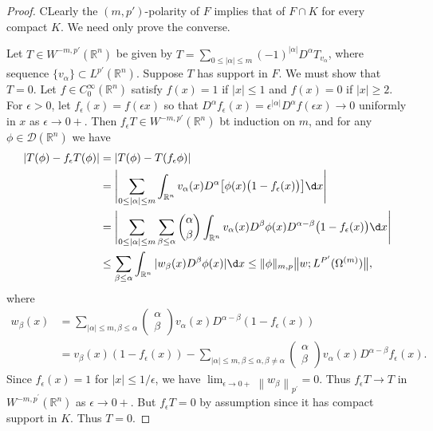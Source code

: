 \begin{proof}
  CLearly the $(m,p')$-polarity of $F$ implies that of $F\cap K$
  for every compact $K$. We need only prove the converse.

  Let $T\in W^{-m,p'}(\mathbb{R}^n)$ be given by $T  = \sum_{0\leq |\alpha|\leq m} (-1)^{|\alpha|}
  D^\alpha T_{v_{\alpha}}$, where sequence $\{v_\alpha\}\subset L^{p'}(\mathbb{R}^n)$.
  Suppose $T$ has support in $F$. We must show that $T = 0$.
  Let $f\in C_0^\infty(\mathbb{R}^n)$ satisfy $f(x) = 1$ if $|x|\leq 1$
  and $f(x) = 0$ if $|x|\geq 2$. For $\epsilon > 0$, let $f_\epsilon (x) = f(\epsilon x)$
  so that $D^\alpha f_\epsilon (x) = \epsilon^{|\alpha|} D^\alpha f(\epsilon x)\to 0$
  uniformly in $x$ as $\epsilon\to 0+$.
  Then $f_\epsilon T \in W^{-m,p'}(\mathbb{R}^n)$ bt induction on $m$,
  and for any $\phi\in\mathscr{D}(\mathbb{R}^n)$ we have
  \begin{align*}
    |T(\phi) - f_\epsilon T(\phi)|
    & = |T(\phi) - T(f_\epsilon \phi)| \\
    & = \Biggl|\sum_{0\leq |\alpha|\leq m} \int_{\mathbb{R}^n} v_\alpha(x)
        D^\alpha \bigl[\phi(x)\bigl(1 - f_\epsilon (x)\bigr)\bigr] \d x \Biggr| \\
    & = \Biggl|\sum_{0\leq |\alpha|\leq m} \sum_{\beta\leq\alpha}
        \binom{\alpha}{\beta} \int_{\mathbb{R}^n} v_\alpha(x)
        D^\beta \phi(x) D^{\alpha-\beta} \bigl(1 - f_\epsilon(x)\bigr) \d x \Biggr| \\
    & \leq \sum_{\beta\leq\alpha} \int_{\mathbb{R}^n} |w_\beta (x) D^\beta \phi(x)| \d x
      \leq \|\phi\|_{m,p} \bigl\|w; L^{P'}(\Omega^{(m)}) \bigr\|,
  \end{align*}
  where
  \[
    \begin{aligned}
    w_\beta(x) & =\sum_{|\alpha| \leq m, \beta \leq \alpha}\left(\begin{array}{c}
    \alpha \\
    \beta
    \end{array}\right) v_\alpha(x) D^{\alpha-\beta}\left(1-f_\epsilon(x)\right) \\
    & =v_\beta(x)\left(1-f_\epsilon(x)\right)-\sum_{|\alpha| \leq m, \beta \leq \alpha, \beta \neq \alpha}\left(\begin{array}{c}
    \alpha \\
    \beta
    \end{array}\right) v_\alpha(x) D^{\alpha-\beta} f_\epsilon(x) .
    \end{aligned}
  \]
  Since $f_\epsilon(x)=1$ for $|x| \leq 1 / \epsilon$, we have $\lim _{\epsilon \rightarrow 0+}\left\|w_\beta\right\|_{p^{\prime}}=0$. Thus $f_\epsilon T \rightarrow T$ in $W^{-m, p^{\prime}}\left(\mathbb{R}^n\right)$ as $\epsilon \rightarrow 0+$. But $f_\epsilon T=0$ by assumption since it has compact support in $K$. Thus $T=0$.
\end{proof}


